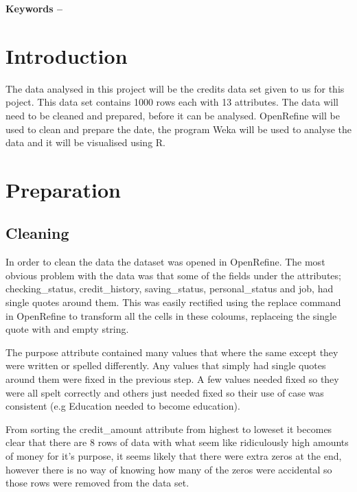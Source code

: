 \documentclass[12pt, a4paper]{article}
\title{\mytitle}
\author{\myauthor\hspace{1em}\\\contact\\Edinburgh Napier University\hspace{0.5em}-\hspace{0.5em}\mymodule}
\date{}
\begin{document}
	\maketitle
	\begin{abstract}
		This projects aim is to prepare, analyse and visualise the data historically recorded by a bank in Germany. The data will be analysed using algorithms such as classification and regression.
	\end{abstract}
	
	\textbf{Keywords -- }{\mykeywords}
	\section{Introduction}
	The data analysed in this project will be the credits data set given to us for this poject. This data set contains 1000 rows each with 13 attributes. 
	The data will need to be cleaned and prepared, before it can be analysed. OpenRefine will be used to clean and prepare the date, the program Weka will be used to analyse the data and it will be visualised using R.
	
	\section{Preparation}
	\subsection{Cleaning}
	In order to clean the data the dataset was opened in OpenRefine. The most obvious problem with the data was that some of the fields under the attributes; checking\_status, credit\_history,  saving\_status, personal\_status and job, had single quotes around them. This was easily rectified using the replace command in OpenRefine to transform all the cells in these coloums, replaceing the single quote with and empty string.
	
	The purpose attribute contained many values that where the same except they were written or spelled differently. Any values that simply had single quotes around them were fixed in the previous step. A few values needed fixed so they were all spelt correctly and others just needed fixed so their use of case was consistent (e.g Education needed to become education).
	
	From sorting the credit\_amount attribute from highest to loweset it becomes clear that there are 8 rows of data with what seem like ridiculously high amounts of money for it's purpose, it seems likely that there were extra zeros at the end, however there is no way of knowing how many of the zeros were accidental so those rows were removed from the data set.
	
\end{document}
